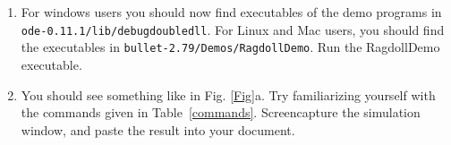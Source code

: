 \documentclass[12pt]{article}
\begin{document}
\begin{enumerate}

\item \label{post-install} For windows users you should now find executables of the demo
  programs in \\ \texttt{ode-0.11.1/lib/debugdoubledll}. For Linux and
  Mac users, you should find the executables in
  \texttt{bullet-2.79/Demos/RagdollDemo}. Run the RagdollDemo
  executable.

\item You should see something like in Fig. \ref{Fig}a. Try familiarizing yourself with the commands given in Table~\ref{commands}. Screencapture the simulation window, and paste the result into your document.


\end{enumerate}
\end{document}
